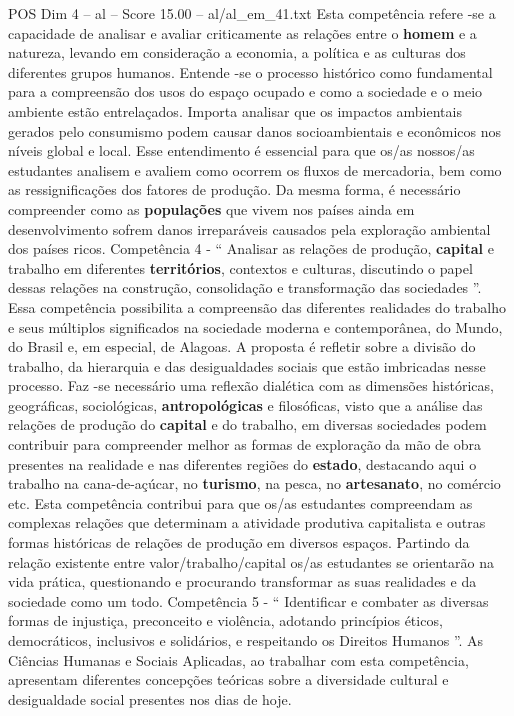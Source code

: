 \begin{textsample}{POS Dim 4 – al – Score 15.00 – al/al\_em\_41.txt}
Esta competência refere -se a capacidade de analisar e avaliar criticamente as relações entre o \textbf{homem} e a natureza, levando em consideração a economia, a política e as culturas dos diferentes grupos humanos.
Entende -se o processo histórico como fundamental para a compreensão dos usos do espaço ocupado e como a sociedade e o meio ambiente estão entrelaçados.
Importa analisar que os impactos ambientais gerados pelo consumismo podem causar danos socioambientais e econômicos nos níveis global e local.
Esse entendimento é essencial para que os/as nossos/as estudantes analisem e avaliem como ocorrem os fluxos de mercadoria, bem como as ressignificações dos fatores de produção.
Da mesma forma, é necessário compreender como as \textbf{populações} que vivem nos países ainda em desenvolvimento sofrem danos irreparáveis causados pela exploração ambiental dos países ricos.
Competência 4 - “ Analisar as relações de produção, \textbf{capital} e trabalho em diferentes \textbf{territórios}, contextos e culturas, discutindo o papel dessas relações na construção, consolidação e transformação das sociedades ”.
Essa competência possibilita a compreensão das diferentes realidades do trabalho e seus múltiplos significados na sociedade moderna e contemporânea, do Mundo, do Brasil e, em especial, de Alagoas.
A proposta é refletir sobre a divisão do trabalho, da hierarquia e das desigualdades sociais que estão imbricadas nesse processo.
Faz -se necessário uma reflexão dialética com as dimensões históricas, geográficas, sociológicas, \textbf{antropológicas} e filosóficas, visto que a análise das relações de produção do \textbf{capital} e do trabalho, em diversas sociedades podem contribuir para compreender melhor as formas de exploração da mão de obra presentes na realidade e nas diferentes regiões do \textbf{estado}, destacando aqui o trabalho na cana-de-açúcar, no \textbf{turismo}, na pesca, no \textbf{artesanato}, no comércio etc.
Esta competência contribui para que os/as estudantes compreendam as complexas relações que determinam a atividade produtiva capitalista e outras formas históricas de relações de produção em diversos espaços.
Partindo da relação existente entre valor/trabalho/capital os/as estudantes se orientarão na vida prática, questionando e procurando transformar as suas realidades e da sociedade como um todo.
Competência 5 - “ Identificar e combater as diversas formas de injustiça, preconceito e violência, adotando princípios éticos, democráticos, inclusivos e solidários, e respeitando os Direitos Humanos ”.
As Ciências Humanas e Sociais Aplicadas, ao trabalhar com esta competência, apresentam diferentes concepções teóricas sobre a diversidade cultural e desigualdade social presentes nos dias de hoje.

\end{textsample}
